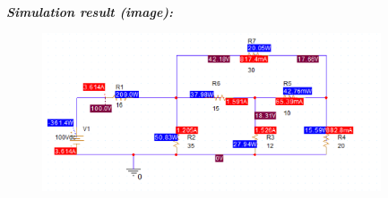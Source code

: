 \bigskip\\
\textit{\textbf{Simulation result (image):}}
\begin{figure}[H]
    \centering
    \includegraphics[width = 10cm]{source/picture/bai_1/ex10_sim.png}
\end{figure}




